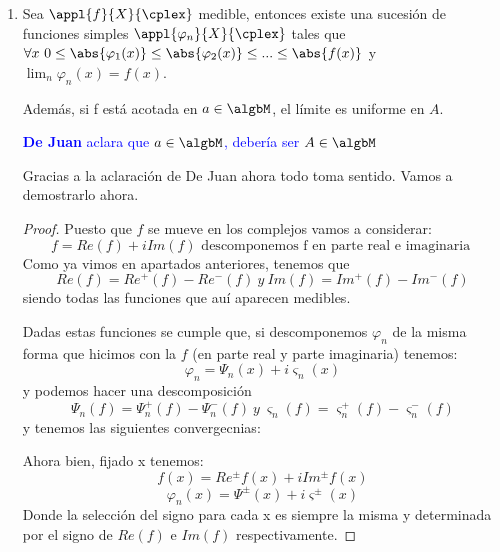 \documentclass{apuntes}
\begin{document}
\begin{enumerate}
\begin{enumerate}
\begin{proof}
\[\forall n \in \nat \ \forall k \in \nat, \ 0 \leq k \leq 2^{2n}-1\]
Definimos
\[E_n^k = f^{-1}((k2^{-n}, (k+1)2^{-n}])\]
y
\[F_n = f^{-1}((2^n, \infty ])\]

Y definimos ahora
\[\varphi_n(x)= \sum_{k=0}^{2^{2n}-1}\left(k2^{-n}\ind_{E_n^k}(x)\right)+2^n \ind_{F_n}\]
Con esta construcción vemos obviamente que $\varphi_n(x) \leq \varphi_{n-+1}(x)$. Además tenemos:
\[\forall x \ \lim_n \varphi_n(x)=f(x)\]

Nos queda ver la última parte del enunciado, que si f está acotada en $A \in \algbM$, $\varphi_n$ converge uniformemente a $f$ en $A$.

Si f está acotada tenemos que $\exists n \ \forall x \in A \ |f(x)|<2^n$. Entonces
\[\forall x \in A, \ \forall m \geq n \ f(x)-f_n(x) < \frac{1}{n}\]
es decir, converge uniformemente en $A$
\end{proof}

\item Sea $\appl{f}{X}{\cplex}$ medible, entonces existe una sucesión de funciones simples $\appl{\varphi_n}{X}{\cplex}$ tales que $\forall x \ 0 \leq \abs{\varphi_1(x)} \leq \abs{\varphi_2(x)} \leq ... \leq \abs{f(x)}$ y $\lim_n \varphi_n(x)=f(x)$.

Además, si f está acotada en $a \in \algbM$, el límite es uniforme en $A$.

\textcolor{blue}{\textbf{De Juan} aclara que $a \in \algbM$, debería ser $A \in \algbM$}

Gracias a la aclaración de De Juan ahora todo toma sentido. Vamos a demostrarlo ahora.
\begin{proof}
Puesto que $f$ se mueve en los complejos vamos a considerar:
\[f=Re(f)+i Im(f) \text{ descomponemos f en parte real e imaginaria }\]
Como ya vimos en apartados anteriores, tenemos que
\[Re(f)=Re^+(f)-Re^-(f) \ y \ Im(f)=Im^+(f)-Im^-(f)\]
siendo todas las funciones que auí aparecen medibles.

Dadas estas funciones se cumple que, si descomponemos $\varphi_n$ de la misma forma que hicimos con la $f$ (en parte real y parte imaginaria) tenemos:
\[\varphi_n = \Psi_n(x)+i\varsigma_n(x)\]
y podemos hacer una descomposición
\[\Psi_n(f)=\Psi_n^+(f)-\Psi_n^-(f) \ y \ \varsigma_n(f)=\varsigma_n^+(f)-\varsigma_n^-(f)\]
y tenemos las siguientes convergecnias:

Ahora bien, fijado x tenemos:
\[f(x)= Re^{\pm}f(x)+i Im^{\pm}f(x)\]
\[\varphi_n(x)= \Psi^{\pm}(x)+i \varsigma^{\pm}(x)\]
Donde la selección del signo para cada x es siempre la misma y determinada por el signo de $Re(f)$ e $Im(f)$ respectivamente.


\end{proof}
\end{enumerate}
\end{enumerate}
\end{document}
